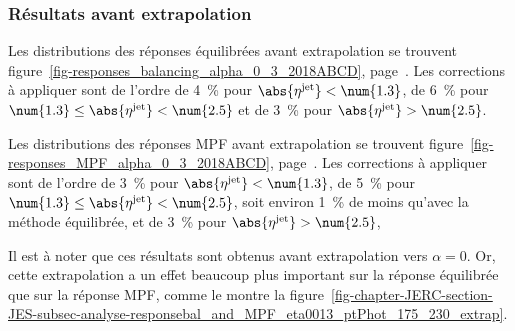 \subsubsection{Résultats avant extrapolation}\label{chapter-JERC-section-JES-subsec-results-subsubsec-before_extrap}
\par Les distributions des réponses équilibrées avant extrapolation se trouvent figure~\ref{fig-responses_balancing_alpha_0_3_2018ABCD}, page~\pageref{fig-responses_balancing_alpha_0_3_2018ABCD}.
Les corrections à appliquer sont de l'ordre
de \SI{4}{\%} pour $\abs{\eta^\text{jet}} < \num{1.3}$,
de \SI{6}{\%} pour $\num{1.3} \leq \abs{\eta^\text{jet}} < \num{2.5}$ et
de \SI{3}{\%} pour $\abs{\eta^\text{jet}} > \num{2.5}$.
\par Les distributions des réponses MPF avant extrapolation se trouvent figure~\ref{fig-responses_MPF_alpha_0_3_2018ABCD}, page~\pageref{fig-responses_MPF_alpha_0_3_2018ABCD}.
Les corrections à appliquer sont de l'ordre
de \SI{3}{\%} pour $\abs{\eta^\text{jet}} < \num{1.3}$,
de \SI{5}{\%} pour $\num{1.3} \leq \abs{\eta^\text{jet}} < \num{2.5}$, soit environ \SI{1}{\%} de moins qu'avec la méthode équilibrée, et
de \SI{3}{\%} pour $\abs{\eta^\text{jet}} > \num{2.5}$,
\par Il est à noter que ces résultats sont obtenus avant extrapolation vers $\alpha=0$. Or, cette extrapolation a un effet beaucoup plus important sur la réponse équilibrée que sur la réponse MPF, comme le montre la figure~\ref{fig-chapter-JERC-section-JES-subsec-analyse-responsebal_and_MPF_eta0013_ptPhot_175_230_extrap}.






